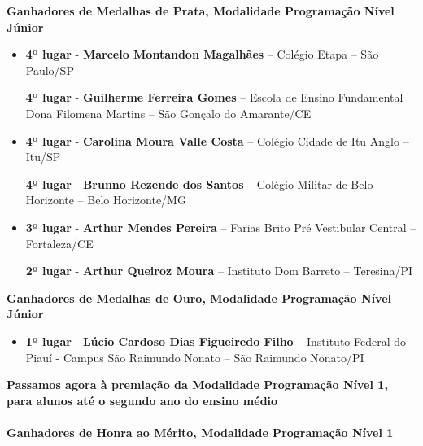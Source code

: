 \documentclass{article}
\begin{document}
\textbf{\color{blue}Ganhadores de Medalhas de Prata, \color{black}Modalidade Programação Nível Júnior}
\color{black}

\begin{itemize}
\item
\textbf{4º lugar} - \textbf{Marcelo Montandon Magalhães} – Colégio Etapa – São Paulo/SP


\textbf{4º lugar} - \textbf{Guilherme Ferreira Gomes} – Escola de Ensino Fundamental Dona Filomena Martins – São Gonçalo do Amarante/CE



\item
\textbf{4º lugar} - \textbf{Carolina Moura Valle Costa} – Colégio Cidade de Itu Anglo – Itu/SP


\textbf{4º lugar} - \textbf{Brunno Rezende dos Santos} – Colégio Militar de Belo Horizonte – Belo Horizonte/MG



\item
\textbf{3º lugar} - \textbf{Arthur Mendes Pereira} – Farias Brito Pré Vestibular Central – Fortaleza/CE


\textbf{2º lugar} - \textbf{Arthur Queiroz Moura} – Instituto Dom Barreto – Teresina/PI



\end{itemize}

\textbf{\color{blue}Ganhadores de Medalhas de Ouro, \color{black}Modalidade Programação Nível Júnior}
\color{black}

\begin{itemize}
\item
\textbf{1º lugar} - \textbf{Lúcio Cardoso Dias Figueiredo Filho} – Instituto Federal do Piauí - Campus São Raimundo Nonato – São Raimundo Nonato/PI



\end{itemize}

\color{blue}
\textbf{Passamos agora à premiação da Modalidade Programação Nível 1, para alunos até o segundo ano do ensino médio}\\\\
\textbf{\color{blue}Ganhadores de Honra ao Mérito, \color{black}Modalidade Programação Nível 1}
\color{black}
\end{document}
